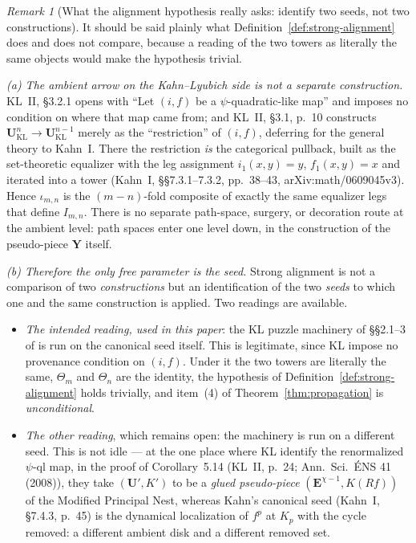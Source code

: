 \documentclass[11pt,reqno]{amsart}
\theoremstyle{definition}
\theoremstyle{remark}
\newtheorem{remark}[theorem]{Remark}
\begin{document}
\begin{remark}[What the alignment hypothesis really asks: identify two
seeds, not two constructions]
\label{rem:alignment-is-seed-identification}
It should be said plainly what Definition~\ref{def:strong-alignment}
does and does not compare, because a reading of the two towers as
literally the same objects would make the hypothesis trivial.

\emph{(a) The ambient arrow on the Kahn--Lyubich side is not a
separate construction.}  KL~II, \S3.2.1 opens with ``Let $(i,f)$ be a
$\psi$-quadratic-like map'' and imposes no condition on where that map
came from; and KL~II, \S3.1, p.~10 constructs
$\mathbf U^{n}_{\mathrm{KL}}\to\mathbf U^{n-1}_{\mathrm{KL}}$ merely as
the ``restriction'' of $(i,f)$, deferring for the general theory to
Kahn~I.  There the restriction \emph{is} the categorical pullback,
built as the set-theoretic equalizer with the leg assignment
$i_{1}(x,y)=y$, $f_{1}(x,y)=x$ and iterated into a tower
(Kahn~I, \S\S7.3.1--7.3.2, pp.~38--43, arXiv:math/0609045v3).  Hence
$\iota_{m,n}$ is the $(m-n)$-fold composite of exactly the same
equalizer legs that define $I_{m,n}$.  There is no separate
path-space, surgery, or decoration route at the ambient level: path
spaces enter one level down, in the construction of the pseudo-piece
$\mathbf Y$ itself.

\emph{(b) Therefore the only free parameter is the seed.}  Strong
alignment is not a comparison of two \emph{constructions} but an
identification of the two \emph{seeds} to which one and the same
construction is applied.  Two readings are available.
\begin{itemize}
\item \emph{The intended reading, used in this paper}: the KL puzzle
  machinery of \S\S2.1--3 of \cite{KLDecorations08} is run on the
  canonical seed itself.  This is legitimate, since KL impose no
  provenance condition on $(i,f)$.  Under it the two towers are
  literally the same, $\Theta_{m}$ and $\Theta_{n}$ are the identity,
  the hypothesis of Definition~\ref{def:strong-alignment} holds
  trivially, and item~(4) of Theorem~\ref{thm:propagation} is
  \emph{unconditional}.
\item \emph{The other reading}, which remains open: the machinery is
  run on a different seed.  This is not idle --- at the one place
  where KL identify the renormalized $\psi$-ql map, in the proof of
  Corollary~5.14 (KL~II, p.~24; Ann.\ Sci.\ \'ENS 41 (2008)), they
  take $(\mathbf U',K')$ to be a \emph{glued pseudo-piece}
  $(\mathbf E^{\chi-1},K(Rf))$ of the Modified Principal Nest,
  whereas Kahn's canonical seed (Kahn~I, \S7.4.3, p.~45) is the
  dynamical localization of $f^{p}$ at $K_{p}$ with the cycle removed:
  a different ambient disk and a different removed set.
\end{itemize}


\end{remark}
\end{document}
